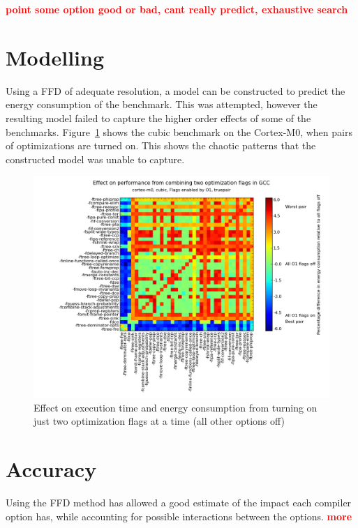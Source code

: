 \documentclass[twocolumn]{article}
\newcommand{\todo}[1]{\textbf{\textcolor{red}{#1}}}
\begin{document}
\todo{point some option good or bad, cant really predict, exhaustive search}

\section*{Modelling}

Using a FFD of adequate resolution, a model can be constructed to predict the energy consumption of the benchmark. This was attempted, however the resulting model failed to capture the higher order effects of some of the benchmarks. Figure~\ref{Fig:twoway_cubic} shows the cubic benchmark on the Cortex-M0, when pairs of optimizations are turned on. This shows the chaotic patterns that the constructed model was unable to capture.

\begin{figure}
	\centering
	\hfill
	\includegraphics[width=0.8\linewidth, clip, trim= 8.8cm 0 7cm 0]{cortex-m0/O1_twoway_effects_cubic.png}
	\hspace{0.6cm}
	\caption{Effect on execution time and energy consumption from turning on just two optimization flags at a time (all other options off)}
	\label{Fig:twoway_cubic}
\end{figure}




\section*{Accuracy}

Using the FFD method has allowed a good estimate of the impact each compiler option has, while accounting for possible interactions between the options.  \todo{more}
\end{document}

